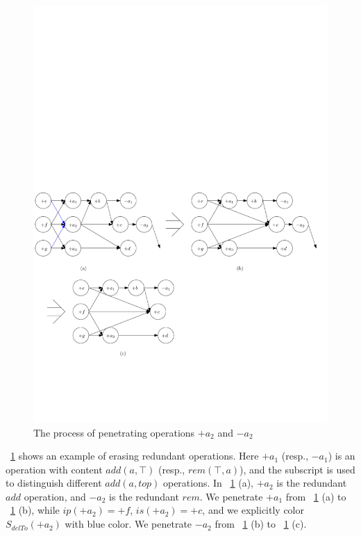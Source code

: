 \begin{figure}[t]
  \centering
  \includegraphics[width=0.8 \textwidth]{figures/PIC-Example-CompactProcess.pdf}
  \caption{The process of penetrating operations $+a_2$ and $-a_2$}
  \label{fig:the process of penetrate operations}
\end{figure}

\figurename~\ref{fig:the process of penetrate operations} shows an example of erasing redundant operations. Here $+a_1$ (resp., $-a_1$) is an operation with content $add(a,\top)$ (resp., $rem(\top,a)$), and the subscript is used to distinguish different $add(a,top)$ operations. In \figurename~\ref{fig:the process of penetrate operations} (a), $+a_2$ is the redundant $add$ operation, and $-a_2$ is the redundant $rem$. We penetrate $+a_1$ from \figurename~\ref{fig:the process of penetrate operations} (a) to \figurename~\ref{fig:the process of penetrate operations} (b), while $ip(+a_2) = +f$, $is(+a_2) = +c$, and we explicitly color $S_{delTo}(+a_2)$ with blue color.  We penetrate $-a_2$ from \figurename~\ref{fig:the process of penetrate operations} (b) to \figurename~\ref{fig:the process of penetrate operations} (c). 


